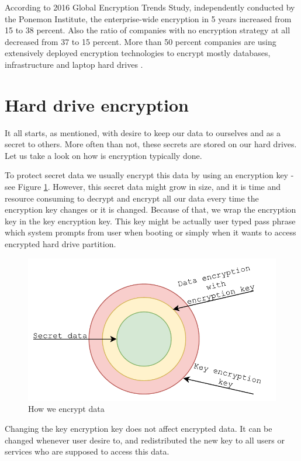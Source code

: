\documentclass[../xdudla00-porting-Tang-to-Open-WRT.tex]{subfiles}
\begin{document}
According to 2016 Global Encryption Trends Study, independently conducted by the Ponemon Institute, the enterprise-wide encryption in 5 years increased from 15 to 38 percent.
Also the ratio of companies with no encryption strategy at all decreased from 37 to 15 percent. 
More than 50 percent companies are using extensively deployed encryption technologies to encrypt mostly databases, infrastructure and laptop hard drives \cite{Thales}. 

\section{Hard drive encryption}

It all starts, as mentioned, with desire to keep our data to ourselves and as a secret to others.
More often than not, these secrets are stored on our hard drives.
Let us take a look on how is encryption typically done.

To protect secret data we usually encrypt this data by using an encryption key - see Figure \ref{fig:encdata}.
However, this secret data might grow in size, and it is time and resource consuming to decrypt and encrypt all our data every time the encryption key changes or it is changed.
Because of that, we wrap the encryption key in the key encryption key. 
This key might be actually user typed pass phrase which system prompts from user when booting or simply when it wants to access encrypted hard drive partition.


\begin{figure}[h]
    \centering
    \includegraphics[scale=0.7]{figures/HowWeEncryptData.pdf} 
    \caption{How we encrypt data}
    \label{fig:encdata}
\end{figure}

Changing the key encryption key does not affect encrypted data.
It can be changed whenever user desire to, and redistributed the new key to all users or services who are supposed to access this data.
\end{document}
